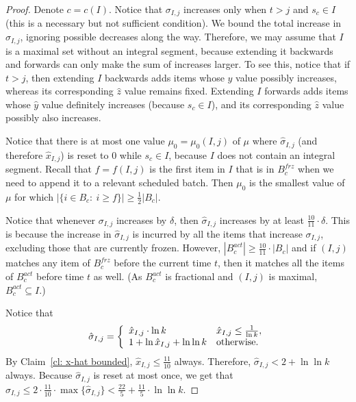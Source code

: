 \documentclass[12pt]{article}
\begin{document}
\begin{proof}
Denote $c = c(I)$. Notice that $\sigma_{I,j}$ increases only when $t > j$
and $s_c \in I$ (this is a necessary but not sufficient condition). We bound
the total increase in $\sigma_{I,j}$, ignoring possible decreases along the
way. Therefore, we may assume that $I$ is a maximal set without an
integral segment, because extending it backwards and forwards can only
make the sum of increases larger. To see this, notice that if $t > j$, then
extending $I$ backwards adds items whose $\hat{y}$ value possibly
increases, whereas its corresponding $\hat{z}$ value remains fixed.
Extending $I$ forwards adds items whose $\hat{y}$ value definitely
increases (because $s_c\in I$), and its corresponding $\hat{z}$ value
possibly also increases.

Notice that there is at most one value $\mu_0 = \mu_0(I,j)$ of $\mu$ 
where $\hat{\sigma}_{I,j}$
(and therefore $\hat{x}_{I,j}$) is reset to $0$ while $s_c\in I$, 
because $I$ does not contain
an integral segment. Recall that $f=f(I,j)$ is the first
item in $I$ that is in $B_c^{frz}$ when we need to append it to a relevant 
scheduled batch. Then $\mu_0$ is the smallest value of $\mu$ for which
$|\{i\in B_c:\ i\ge f\}|\ge \frac 1 2 |B_c|$.

Notice that whenever $\sigma_{I,j}$
increases by $\delta$, then $\hat{\sigma}_{I,j}$ increases by at least
$\frac{10}{11}\cdot\delta$. This is because the increase in $\hat{\sigma}_{I,j}$
is incurred by all the items that increase $\sigma_{I,j}$, excluding those that
are currently frozen. However, $|B_c^{act}|\ge \frac{10}{11}\cdot |B_c|$ and
if $(I,j)$ matches any item of $B_c^{frz}$ before the current time $t$, then it
matches all the items of $B_c^{act}$ before time $t$ as well. (As $B_c^{act}$
is fractional and $(I,j)$ is maximal, $B_c^{act}\subseteq I$.)

Notice that
$$
\hat{\sigma}_{I,j} = \left\{\begin{array}{ll}
                                      \hat{x}_{I,j}\cdot\ln k & \hat{x}_{I,j}\le\frac{1}{\ln k},\\
                                      1 + \ln\hat{x}_{I,j} + \ln\ln k & \hbox{otherwise.}
                                      \end{array}\right.
$$
By Claim~\ref{cl: x-hat bounded}, $\hat{x}_{I,j}\le\frac{11}{10}$ always.
Therefore, $\hat{\sigma}_{I,j} < 2 + \ln\ln k$ always. Because
$\hat{\sigma}_{I,j}$ is reset at most once, we get that 
$\sigma_{I,j}\le 2\cdot\frac{11}{10}\cdot\max\{\hat{\sigma}_{I,j}\} < \frac{22}{5} + \frac{11}{5}\cdot\ln\ln k$.
\end{proof}
\end{document}

